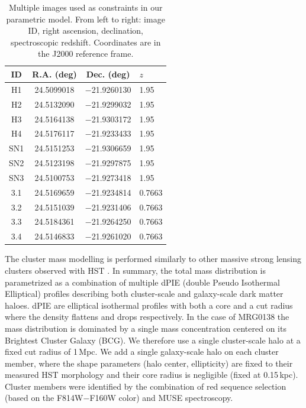 \documentclass[12pt]{article}
\begin{document}
\begin{table}[ht]
    \centering
    \begin{tabular}{cccl}
     ID &   R.A. (deg) & Dec. (deg) & $z$ \\
     \midrule
H1 & 24.5099018 & $-$21.9260130 & 1.95 \\
H2 & 24.5132090 & $-$21.9299032 & 1.95 \\
H3 & 24.5164138 & $-$21.9303172 & 1.95 \\
H4 & 24.5176117 & $-$21.9233433 & 1.95 \\
     \midrule
SN1 & 24.5151253 & $-$21.9306659 & 1.95 \\
SN2 & 24.5123198 & $-$21.9297875 & 1.95 \\
SN3 & 24.5100753 & $-$21.9273418 & 1.95 \\
     \midrule
3.1 & 24.5169659 & $-$21.9234814 & 0.7663 \\
3.2 & 24.5151039 & $-$21.9231406 & 0.7663 \\
3.3 & 24.5184361 & $-$21.9264250 & 0.7663 \\
3.4 & 24.5146833 & $-$21.9261020 & 0.7663 \\
    \end{tabular}
    \caption{Multiple images used as constraints in our parametric model. From left to right: image ID, right ascension, declination, spectroscopic redshift.  Coordinates are in the J2000 reference frame.}
    \label{tab:mulimages}
\end{table}

The cluster mass modelling is performed similarly to other massive strong lensing clusters observed with HST \cite{richard_mass_2014}. In summary, the total mass distribution is parametrized as a combination of multiple dPIE (double Pseudo Isothermal Elliptical) profiles describing both cluster-scale and galaxy-scale dark matter haloes. dPIE are elliptical isothermal profiles with both a core and a cut radius where the density flattens and drops respectively. In the case of MRG0138 the mass distribution is dominated by a single mass concentration centered on its Brightest Cluster Galaxy (BCG). We therefore use a single cluster-scale halo at a fixed cut radius of 1\,Mpc.  We add a single galaxy-scale halo on each cluster member, where the shape parameters (halo center, ellipticity) are fixed to their measured HST morphology and their core radius is negligible (fixed at 0.15\,kpc). 
 Cluster members were identified by the combination of red sequence selection (based on the F814W$-$F160W color) and MUSE spectroscopy.
\end{document}
